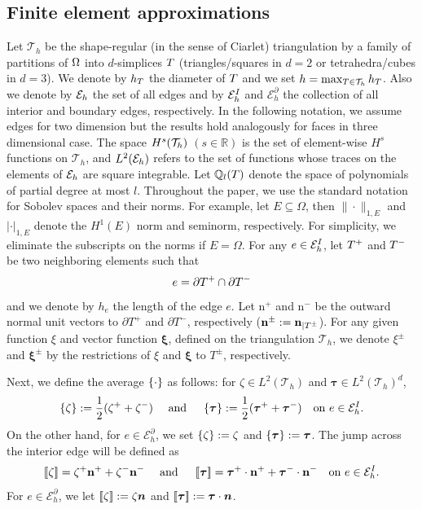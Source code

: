 \documentclass{article}
\begin{document}
\subsection{Finite element approximations}
Let $\mathcal{T}_h$ be the shape-regular (in the sense of Ciarlet)  triangulation by a family of partitions of $\Omega$ into $d$-simplices $T$ (triangles/squares in $d=2$ or tetrahedra/cubes in $d=3$). We denote by $h_{T}$ the diameter of $T$ and we set $h=\max_{T \in \mathcal{T}_h} h_{T}$.  
Also we denote by ${{\mathcal E}_h}$ the set of all edges and by ${{\mathcal E}^{I}_h}$ and $\mathcal{E}^{\partial}_{h}$ the collection of all interior and boundary edges, respectively. 
In the following notation, we assume edges for two dimension but the results hold analogously for faces in three dimensional case.
The space $H^{s}(\mathcal{T}_h)$ $(s\in \mathbb{R})$ is the set of element-wise $H^{s}$ functions on $\mathcal{T}_h$, and $L^{2}({{\mathcal E}_h})$ refers to the set of functions whose traces on the elements of ${{\mathcal E}_h}$ are square integrable. Let $\mathbb{Q}_l(T)$ denote the space of polynomials of partial degree at most $l$. 
Throughout the paper, we use the standard notation for Sobolev spaces and their norms. For example, let $E \subseteq \Omega$, then $\|\cdot\|_{1,E}$ and $|\cdot|_{1,E}$ denote the $H^1(E)$ norm and seminorm, respectively. 
For simplicity, we eliminate the subscripts on the norms if $E = \Omega$.
For any $e \in {{\mathcal E}^{I}_h}$, let $T^{+}$ and $T^{-}$ be two neighboring elements such that  
$$
e = \partial T^{+}\cap \partial T^{-}
$$
and we denote by $h_{e}$ the length of the edge $e$. 
Let $\bm{\mathrm{n}}^{+}$ and $\bm{\mathrm{n}}^{-}$ be the outward normal unit vectors to  $\partial T^+$ and $\partial T^-$, respectively ($\bm{\mathrm{n}}^{\pm} :=\bm{\mathrm{n}}_{|T^{\pm}}$). 
For any given function $\xi$ and vector function $\bm{\xi}$, defined on the triangulation $\mathcal{T}_h$, we denote $\xi^{\pm}$ and $\bm{\xi}^{\pm}$ by the restrictions of $\xi$ and $\bm{\xi}$ to $T^\pm$, respectively. 

Next, we define the  average $\left\{ \cdot \right\}$ as follows: for $\zeta \in L^2(\mathcal{T}_h)$ and $\bm{\tau} \in L^2(\mathcal{T}_h)^d$,
\begin{equation}\label{av-w}
\left\{ \zeta \right\} := \frac{1}{2} (\zeta^+ + \zeta^- )
\quad \mbox{ and } \quad 
\left\{ \bm{\tau} \right\} := \frac{1}{2} (\bm{\tau}^+ +   \bm{\tau}^-) \quad \mbox{on } e\in
{{\mathcal E}^{I}_h}.
\end{equation}
On the other hand, for $e \in \mathcal{E}^{\partial}_{h}$, we set $\left\{ \zeta \right\} :=   \zeta$ and $\left\{ \bm{\tau} \right\} :=  \bm{\tau}$. 
The jump across the interior edge will be defined as 
\begin{align*}
\left\lbrack\!\left\lbrack \zeta \right\rbrack\!\right\rbrack = \zeta^+\bm{\mathrm{n}}^++\zeta^-\bm{\mathrm{n}}^- \quad \mbox{ and } \quad \left\lbrack\!\left\lbrack {\boldsymbol {\tau}} \right\rbrack\!\right\rbrack = \bm{\tau}^+\cdot\bm{\mathrm{n}}^+ + \bm{\tau}^-\cdot\bm{\mathrm{n}}^- \quad \mbox{on } e\in {{\mathcal E}^{I}_h}. 
\end{align*}
For  $e \in \mathcal{E}^{\partial}_{h}$, we let $\left\lbrack\!\left\lbrack \zeta \right\rbrack\!\right\rbrack :=  \zeta \bm{n}$ and $\left\lbrack\!\left\lbrack \bm{\tau} \right\rbrack\!\right\rbrack :=  \bm{\tau} \cdot \bm{n}$. 
\end{document}
